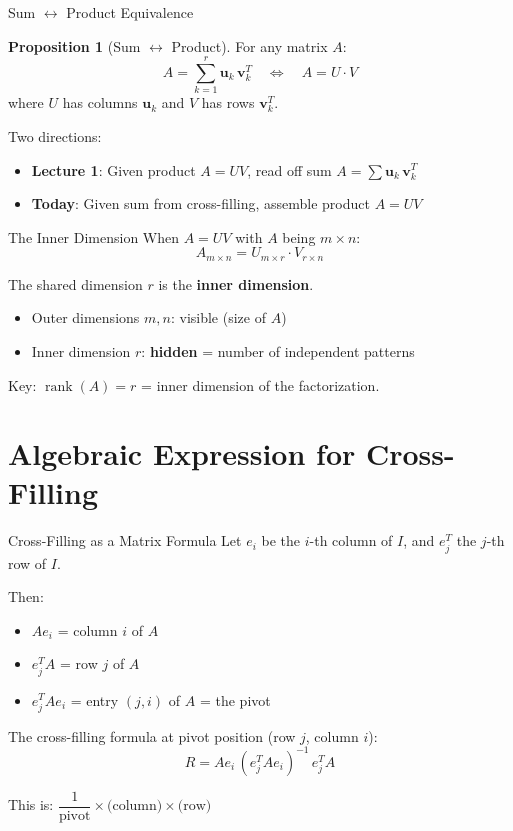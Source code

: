 \documentclass[10pt]{beamer}
\theoremstyle{definition}
\newtheorem{prop}{Proposition}[section]
\newcommand{\x}[1]{\alert{\textbf{#1}}}
\begin{document}
\begin{frame}{Sum $\leftrightarrow$ Product Equivalence}
\begin{prop}[Sum $\leftrightarrow$ Product]
For any matrix $A$:
$$A = \sum_{k=1}^r \mathbf{u}_k\,\mathbf{v}_k^T \quad \Longleftrightarrow \quad A = U \cdot V$$
where $U$ has columns $\mathbf{u}_k$ and $V$ has rows $\mathbf{v}_k^T$.
\end{prop}

\vfill
Two directions:
\begin{itemize}
\item \textbf{Lecture 1}: Given product $A = UV$, read off sum $A = \sum \mathbf{u}_k\,\mathbf{v}_k^T$
\item \textbf{Today}: Given sum from cross-filling, assemble product $A = UV$
\end{itemize}
\end{frame}

\begin{frame}{The Inner Dimension}
When $A = UV$ with $A$ being $m \times n$:
$$A_{m \times n} = U_{m \times \boxed{r}} \cdot V_{\boxed{r} \times n}$$

The shared dimension $r$ is the \x{inner dimension}.

\vfill
\begin{itemize}
\item Outer dimensions $m, n$: visible (size of $A$)
\item Inner dimension $r$: \x{hidden} = number of independent patterns
\end{itemize}

\vfill
Key: $\operatorname{rank}(A) = r$ = inner dimension of the factorization.
\end{frame}

\section{Algebraic Expression for Cross-Filling}

\begin{frame}{Cross-Filling as a Matrix Formula}
Let $e_i$ be the $i$-th column of $I$, and $e_j^T$ the $j$-th row of $I$.

\vfill
Then:
\begin{itemize}
\item $Ae_i$ = column $i$ of $A$
\item $e_j^T A$ = row $j$ of $A$
\item $e_j^T A e_i$ = entry $(j,i)$ of $A$ = the pivot
\end{itemize}

\vfill
The cross-filling formula at pivot position (row $j$, column $i$):
$$\boxed{R = A e_i \, (e_j^T A e_i)^{-1} \, e_j^T A}$$

\vfill
This is: $\dfrac{1}{\text{pivot}} \times \text{(column)} \times \text{(row)}$
\end{frame}
\end{document}

